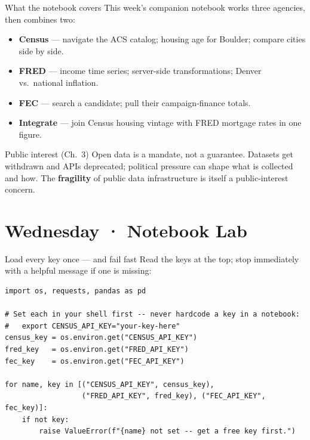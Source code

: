 \documentclass[9pt,aspectratio=169]{beamer}
\begin{document}
\begin{frame}{What the notebook covers}
    This week's companion notebook works three agencies, then combines two:
    \begin{itemize}
        \item \textbf{Census} --- navigate the ACS catalog; housing age for Boulder; compare cities side by side.
        \item \textbf{FRED} --- income time series; server-side transformations; Denver vs.\ national inflation.
        \item \textbf{FEC} --- search a candidate; pull their campaign-finance totals.
        \item \textbf{Integrate} --- join Census housing vintage with FRED mortgage rates in one figure.
    \end{itemize}

    \vspace{0.75em}

    \begin{alertblock}{Public interest (Ch.~3)}
        \footnotesize Open data is a mandate, not a guarantee. Datasets get withdrawn and APIs deprecated; political pressure can shape what is collected and how. The \textbf{fragility} of public data infrastructure is itself a public-interest concern.
    \end{alertblock}
\end{frame}

\section{Wednesday · Notebook Lab}

\begin{frame}[fragile]{Load every key once --- and fail fast}
    Read the keys at the top; stop immediately with a helpful message if one is missing:
\begin{lstlisting}
import os, requests, pandas as pd

# Set each in your shell first -- never hardcode a key in a notebook:
#   export CENSUS_API_KEY="your-key-here"
census_key = os.environ.get("CENSUS_API_KEY")
fred_key   = os.environ.get("FRED_API_KEY")
fec_key    = os.environ.get("FEC_API_KEY")

for name, key in [("CENSUS_API_KEY", census_key),
                  ("FRED_API_KEY", fred_key), ("FEC_API_KEY", fec_key)]:
    if not key:
        raise ValueError(f"{name} not set -- get a free key first.")
\end{lstlisting}
\end{frame}
\end{document}
